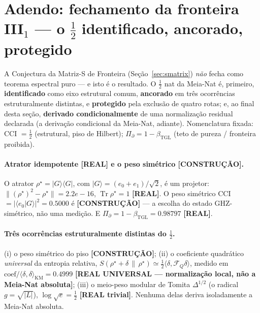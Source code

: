 \documentclass[12pt,a4paper]{article}
\newcommand{\betatgl}{\beta_{\text{TGL}}}
\newcommand{\rhostar}{\rho^{\star}}
\begin{document}
\section{Adendo: fechamento da fronteira III$_1$ --- o $\tfrac12$ identificado, ancorado, protegido}
\label{sec:halfnat-closure}
A Conjectura da Matriz-S de Fronteira (Seção~\ref{sec:smatrix}) \emph{não} fecha como teorema espectral puro --- e isto é o resultado. O $\tfrac12$ nat da Meia-Nat é, primeiro, \textbf{identificado} como eixo estrutural comum, \textbf{ancorado} em três ocorrências estruturalmente distintas, e \textbf{protegido} pela exclusão de quatro rotas; e, ao final desta seção, \textbf{derivado condicionalmente} de uma normalização residual declarada (a derivação condicional da Meia-Nat, adiante). Nomenclatura fixada: CCI $=\tfrac12$ (estrutural, piso de Hilbert); $\Pi_\partial = 1-\betatgl$ (teto de pureza / fronteira proibida).

\paragraph{Atrator idempotente \textbf{[REAL]} e o peso simétrico \textbf{[CONSTRUÇÃO]}.} O atrator $\rhostar = |G\rangle\langle G|$, com $|G\rangle = (e_0+e_1)/\sqrt2$, é um projetor: $\lVert(\rhostar)^2 - \rhostar\rVert = 2.2e-16$, $\operatorname{Tr}\rhostar = 1$ \textbf{[REAL]}. O peso simétrico CCI $= |\langle e_0|G\rangle|^2 = 0.5000$ é \textbf{[CONSTRUÇÃO]} --- a escolha do estado GHZ-simétrico, não uma medição. E $\Pi_\partial = 1-\betatgl = 0.98797$ \textbf{[REAL]}.

\paragraph{Três ocorrências estruturalmente distintas do $\tfrac12$.} (i) o peso simétrico do piso \textbf{[CONSTRUÇÃO]}; (ii) o coeficiente quadrático \emph{universal} da entropia relativa, $S(\rhostar+\delta\,\|\,\rhostar) \simeq \tfrac12\langle\delta,\mathcal F_Q\delta\rangle$, medido em $\text{coef}/\langle\delta,\delta\rangle_{\mathrm{KM}} = 0.4999$ \textbf{[REAL UNIVERSAL --- normalização local, não a Meia-Nat absoluta]}; (iii) o meio-peso modular de Tomita $\Delta^{1/2}$ (o radical $g=\sqrt{|L|}$), $\log\sqrt e = \tfrac12$ \textbf{[REAL trivial]}. Nenhuma delas deriva isoladamente a Meia-Nat absoluta.
\end{document}
